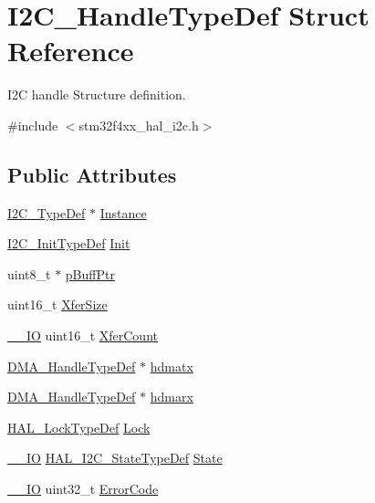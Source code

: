 \hypertarget{struct_i2_c___handle_type_def}{}\section{I2\+C\+\_\+\+Handle\+Type\+Def Struct Reference}
\label{struct_i2_c___handle_type_def}


I2C handle Structure definition.  




{\ttfamily \#include $<$stm32f4xx\+\_\+hal\+\_\+i2c.\+h$>$}

\subsection*{Public Attributes}
\begin{DoxyCompactItemize}
\item 
\hyperlink{struct_i2_c___type_def}{I2\+C\+\_\+\+Type\+Def} $\ast$ \hyperlink{struct_i2_c___handle_type_def_ad83b15a12a41fb3958c55085adf931dd}{Instance}
\item 
\hyperlink{struct_i2_c___init_type_def}{I2\+C\+\_\+\+Init\+Type\+Def} \hyperlink{struct_i2_c___handle_type_def_a86c7e0e7be29686399208f9bb07ae2a2}{Init}
\item 
uint8\+\_\+t $\ast$ \hyperlink{struct_i2_c___handle_type_def_a6adc95451a3eec4b104564fc3fe8b109}{p\+Buff\+Ptr}
\item 
uint16\+\_\+t \hyperlink{struct_i2_c___handle_type_def_a47afa75961930ab1743f47245fdf6e85}{Xfer\+Size}
\item 
\hyperlink{core__sc300_8h_aec43007d9998a0a0e01faede4133d6be}{\+\_\+\+\_\+\+IO} uint16\+\_\+t \hyperlink{struct_i2_c___handle_type_def_a1860b3cf8f463c2751d0c935f33e0ad4}{Xfer\+Count}
\item 
\hyperlink{group___d_m_a___exported___types_ga41b754a906b86bce54dc79938970138b}{D\+M\+A\+\_\+\+Handle\+Type\+Def} $\ast$ \hyperlink{struct_i2_c___handle_type_def_adb4429cdf02e5564464a1517229826b6}{hdmatx}
\item 
\hyperlink{group___d_m_a___exported___types_ga41b754a906b86bce54dc79938970138b}{D\+M\+A\+\_\+\+Handle\+Type\+Def} $\ast$ \hyperlink{struct_i2_c___handle_type_def_ad1778574d987009683c8120bd16aa9cf}{hdmarx}
\item 
\hyperlink{stm32f4xx__hal__def_8h_ab367482e943333a1299294eadaad284b}{H\+A\+L\+\_\+\+Lock\+Type\+Def} \hyperlink{struct_i2_c___handle_type_def_af28a07c34f97e2b2ade505357a467a50}{Lock}
\item 
\hyperlink{core__sc300_8h_aec43007d9998a0a0e01faede4133d6be}{\+\_\+\+\_\+\+IO} \hyperlink{group___i2_c___exported___types_gaef355af8eab251ae2a19ee164ad81c37}{H\+A\+L\+\_\+\+I2\+C\+\_\+\+State\+Type\+Def} \hyperlink{struct_i2_c___handle_type_def_a5b37a3a29bc768fb1c3ff192ab94b6e3}{State}
\item 
\hyperlink{core__sc300_8h_aec43007d9998a0a0e01faede4133d6be}{\+\_\+\+\_\+\+IO} uint32\+\_\+t \hyperlink{struct_i2_c___handle_type_def_a15acfdb4bc2e1da9470e9823f127d8f9}{Error\+Code}
\end{DoxyCompactItemize}


